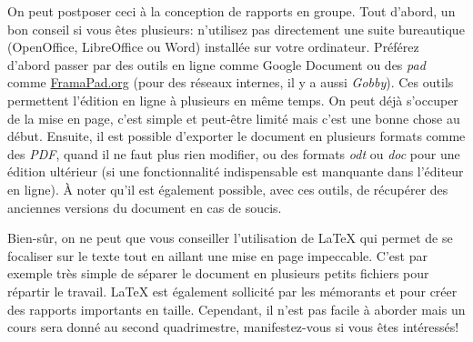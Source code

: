 On peut postposer ceci à la conception de rapports en groupe. Tout d'abord, un bon conseil si vous êtes plusieurs: n'utilisez pas directement une suite bureautique (OpenOffice, LibreOffice ou Word) installée sur votre ordinateur. Préférez d'abord passer par des outils en ligne comme Google Document ou des \textit{pad} comme \url{FramaPad.org} (pour des réseaux internes, il y a aussi \textit{Gobby}). Ces outils permettent l'édition en ligne à plusieurs en même temps. On peut déjà s'occuper de la mise en page, c'est simple et peut-être limité mais c'est une bonne chose au début. Ensuite, il est possible d'exporter le document en plusieurs formats comme des \textit{PDF}, quand il ne faut plus rien modifier, ou des formats \textit{odt} ou \textit{doc} pour une édition ultérieur (si une fonctionnalité indispensable est manquante dans l'éditeur en ligne). À noter qu'il est également possible, avec ces outils, de récupérer des anciennes versions du document en cas de soucis.

Bien-sûr, on ne peut que vous conseiller l'utilisation de \LaTeX{} qui permet de se focaliser sur le texte tout en aillant une mise en page impeccable. C'est par exemple très simple de séparer le document en plusieurs petits fichiers pour répartir le travail. \LaTeX{} est également sollicité par les mémorants et pour créer des rapports importants en taille. Cependant, il n'est pas facile à aborder mais un cours sera donné au second quadrimestre, manifestez-vous si vous êtes intéressés!
                                                                                                                   

	
	
		
